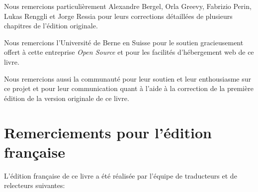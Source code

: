 \documentclass[a4paper,10pt,twoside]{book}
\begin{document}
Nous remercions particuli\`erement Alexandre Bergel, Orla Greevy,
Fabrizio Perin, Lukas Renggli et Jorge Ressia pour leurs
corrections détaillées de plusieurs chapitres
de l'édition originale. %

Nous remercions l'Universit\'e de Berne en Suisse pour le soutien
gracieusement offert \`a cette entreprise \emph{Open Source} et pour
les facilit\'es d'h\'ebergement web de ce livre.

Nous remercions aussi la communauté \squeak pour leur soutien et leur
enthousiasme sur ce projet et pour leur communication quant à l'aide à
la correction de la première édition 
de la version originale %
de ce livre. %

\section*{Remerciements pour l'\'edition fran\c{c}aise}

L'\'edition fran\c{c}aise de ce livre a \'et\'e r\'ealis\'ee par
l'\'equipe de traducteurs et de relecteurs suivantes: 


\ifx\wholebook\relax\else
   
   
\end{document}
